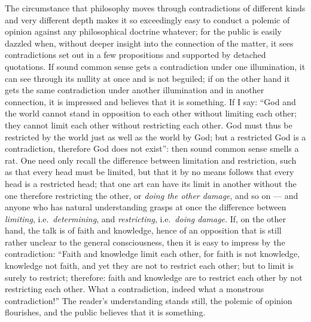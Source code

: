 \documentclass[12pt]{book}
\newcommand{\opage}[1]{\marginnote{\footnotesize\textit{[#1]}}}
\begin{document}
The circumstance that philosophy moves through contradictions of different
kinds and very different depth makes it so exceedingly easy to conduct a
polemic of opinion against any philosophical doctrine whatever; for the
public is easily dazzled when, without deeper insight into the connection
of the matter, it sees contradictions set out in a few propositions and
supported by detached quotations. If sound common sense gets a
contradiction under one illumination, it can see through its nullity at
once and is not beguiled; if on the other hand it gets the same
contradiction under another illumination and in another connection, it is
impressed and believes that it is something. If I say: ``God and the world
cannot stand in opposition to each other without limiting each other; they
cannot limit each other without restricting each other. God must thus be
restricted by the world just as well as the world by God; but a
restricted God is a contradiction, therefore God does not exist'': then
sound common sense smells a rat. One need only recall the difference
between limitation and restriction, such as that every head must be
limited, but that it by no means follows that every head is a restricted
head; that one art can have its limit in another without the one
therefore restricting the other, or \emph{doing the other damage}, and so
on --- and anyone who has natural understanding grasps at once the
difference between \emph{limiting}, i.e.\ \emph{determining}, and
\emph{restricting}, i.e.\ \emph{doing damage}. If, on the other hand, the
talk is of faith and knowledge, hence of an opposition that is still
rather unclear to the general consciousness, then it is easy to impress
by the contradiction: ``Faith and knowledge
\opage{325}\setcounter{footnote}{0}%
limit each other, for faith is not knowledge, knowledge not faith, and yet
they are not to restrict each other; but to limit is surely to restrict;
therefore: faith and knowledge are to restrict each other by not
restricting each other. What a contradiction, indeed what a monstrous
contradiction!'' The reader's understanding stands still, the polemic of
opinion flourishes, and the public believes that it is something.
\end{document}
